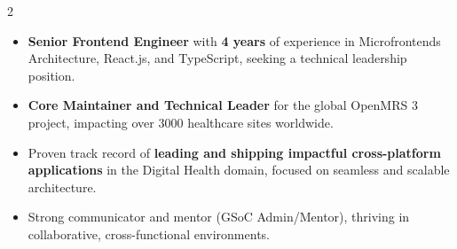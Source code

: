\documentclass[8pt,a4paper,normalphoto]{altacv}
\begin{document}
\begin{paracol}{2}





\begin{itemize}
    \item \textbf{Senior Frontend Engineer} with \textbf{4 years} of experience in Microfrontends Architecture, React.js, and TypeScript, seeking a technical leadership position.
    \item \textbf{Core Maintainer and Technical Leader} for the global OpenMRS 3 project, impacting over 3000 healthcare sites worldwide.
    \item Proven track record of \textbf{leading and shipping impactful cross-platform applications} in the Digital Health domain, focused on seamless and scalable architecture.
    \item Strong communicator and mentor (GSoC Admin/Mentor), thriving in collaborative, cross-functional environments.
\end{itemize}


    

    



\end{paracol}
\end{document}
